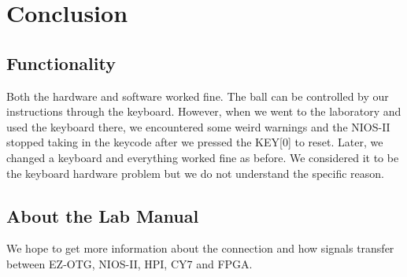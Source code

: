 \documentclass[12pt]{article}
\begin{document}
\section{Conclusion}
\subsection{Functionality}
Both the hardware and software worked fine. The ball can be controlled by our instructions through the keyboard. However, when we went to the laboratory and used the keyboard there, we encountered some weird warnings and the NIOS-II stopped taking in the keycode after we pressed the KEY[0] to reset. Later, we changed a keyboard and everything worked fine as before. We considered it to be the keyboard hardware problem but we do not understand the specific reason.

\subsection{About the Lab Manual}
We hope to get more information about the connection and how signals transfer between EZ-OTG, NIOS-II, HPI, CY7 and FPGA.

\newpage


\end{document}
